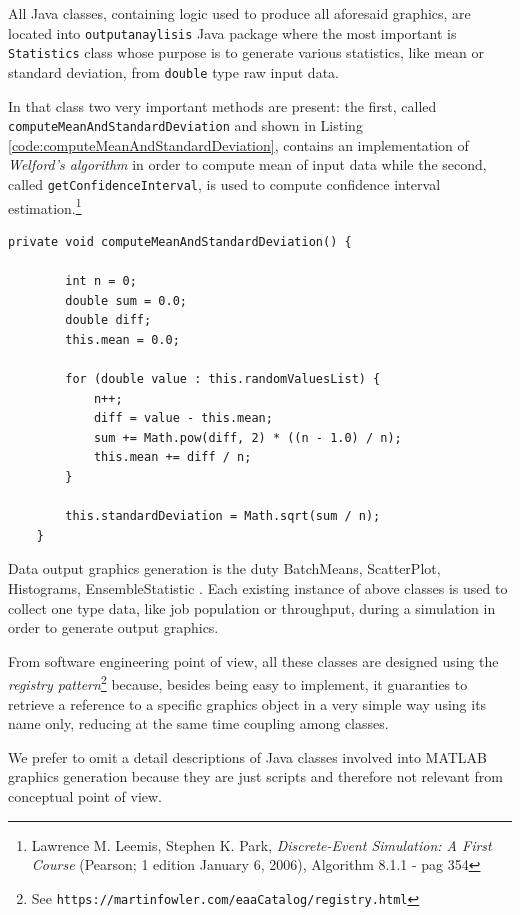 \documentclass[10pt,a4paper]{article}
\begin{document}
All Java classes, containing logic used to produce all aforesaid graphics, are located into \texttt{outputanaylisis} Java package where the most important is \texttt{Statistics} class whose purpose is to generate various statistics, like mean or standard deviation, from \texttt{double} type raw input data. 

In that class two very important methods are present: the first, called \texttt{computeMeanAnd\-Stan\-dard\-Deviation} and shown in Listing \ref{code:computeMeanAndStandardDeviation}, contains an implementation of \textit{Welford’s algorithm} in order to compute mean of input data while the second, called \texttt{getConfidenceInterval}, is used to compute confidence interval estimation.\footnote{Lawrence M. Leemis, Stephen K. Park, \textit{Discrete-Event Simulation: A First Course} (Pearson; 1 edition January 6, 2006), Algorithm 8.1.1 - pag 354}

\begin{lstlisting}[frame=lines, caption={\texttt{computeMeanAndStandardDeviation} method implementation},label={code:computeMeanAndStandardDeviation}]
private void computeMeanAndStandardDeviation() {

        int n = 0;
        double sum = 0.0;
        double diff;
        this.mean = 0.0;

        for (double value : this.randomValuesList) {
            n++;
            diff = value - this.mean;
            sum += Math.pow(diff, 2) * ((n - 1.0) / n);
            this.mean += diff / n;
        }

        this.standardDeviation = Math.sqrt(sum / n);
    }
\end{lstlisting}

Data output graphics generation is the duty 
BatchMeans, ScatterPlot, Histograms, EnsembleStatistic . Each existing instance of above classes is used to collect one type data, like job population or throughput, during a simulation in order to generate output graphics.

From software engineering point of view, all these classes are designed using the \textit{registry pattern}\footnote{See \texttt{https://martinfowler.com/eaaCatalog/registry.html}} because, besides being easy to implement, it guaranties to retrieve a reference to a specific   graphics object in a very simple way using its name only, reducing at the same time coupling among classes. 

We prefer to omit a detail descriptions of Java classes involved into MATLAB graphics generation because they are just scripts and therefore not relevant from conceptual point of view. 
\end{document}
